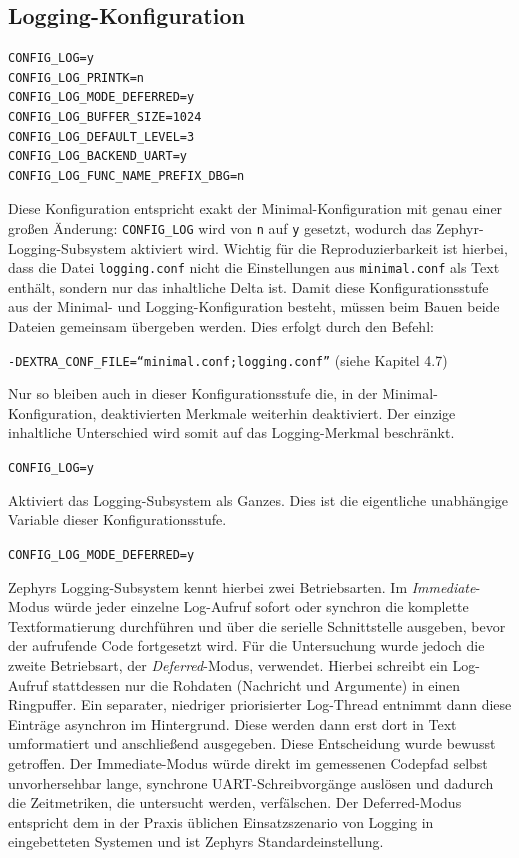 \subsection{Logging-Konfiguration}
\begin{lstlisting}[style=basecode,language=Kconfig]
CONFIG_LOG=y
CONFIG_LOG_PRINTK=n
CONFIG_LOG_MODE_DEFERRED=y
CONFIG_LOG_BUFFER_SIZE=1024
CONFIG_LOG_DEFAULT_LEVEL=3
CONFIG_LOG_BACKEND_UART=y
CONFIG_LOG_FUNC_NAME_PREFIX_DBG=n
\end{lstlisting}
Diese Konfiguration entspricht exakt der Minimal-Konfiguration mit genau einer großen Änderung: \lstinline[style=fileinline]|CONFIG_LOG| wird von \lstinline[style=fileinline]|n| auf \lstinline[style=fileinline]|y| gesetzt, wodurch das Zephyr-Logging-Subsystem aktiviert wird. Wichtig für die Reproduzierbarkeit ist hierbei, dass die Datei \lstinline[style=fileinline]|logging.conf| nicht die Einstellungen aus \lstinline[style=fileinline]|minimal.conf| als Text enthält, sondern nur das inhaltliche Delta ist. Damit diese Konfigurationsstufe aus der Minimal- und Logging-Konfiguration besteht, müssen beim Bauen beide Dateien gemeinsam übergeben werden. Dies erfolgt durch den Befehl:

\lstinline[style=fileinline]|-DEXTRA_CONF_FILE=“minimal.conf;logging.conf”| (siehe Kapitel 4.7)

Nur so bleiben auch in dieser Konfigurationsstufe die, in der Minimal-Konfiguration, deaktivierten Merkmale weiterhin deaktiviert. Der einzige inhaltliche Unterschied wird somit auf das Logging-Merkmal beschränkt.

\lstinline[style=fileinline]|CONFIG_LOG=y|

Aktiviert das Logging-Subsystem als Ganzes. Dies ist die eigentliche unabhängige Variable dieser Konfigurationsstufe.

\lstinline[style=fileinline]|CONFIG_LOG_MODE_DEFERRED=y|

Zephyrs Logging-Subsystem kennt hierbei zwei Betriebsarten. Im \emph{Immediate}-Modus würde jeder einzelne Log-Aufruf sofort oder synchron die komplette Textformatierung durchführen und über die serielle Schnittstelle ausgeben, bevor der aufrufende Code fortgesetzt wird. Für die Untersuchung wurde jedoch die zweite Betriebsart, der \emph{Deferred}-Modus, verwendet. Hierbei schreibt ein Log-Aufruf stattdessen nur die Rohdaten (Nachricht und Argumente) in einen Ringpuffer. Ein separater, niedriger priorisierter Log-Thread entnimmt dann diese Einträge asynchron im Hintergrund. Diese werden dann erst dort in Text umformatiert und anschließend ausgegeben. Diese Entscheidung wurde bewusst getroffen. Der Immediate-Modus würde direkt im gemessenen Codepfad selbst unvorhersehbar lange, synchrone UART-Schreibvorgänge auslösen und dadurch die Zeitmetriken, die untersucht werden, verfälschen. Der Deferred-Modus entspricht dem in der Praxis üblichen Einsatzszenario von Logging in eingebetteten Systemen und ist Zephyrs Standardeinstellung.

